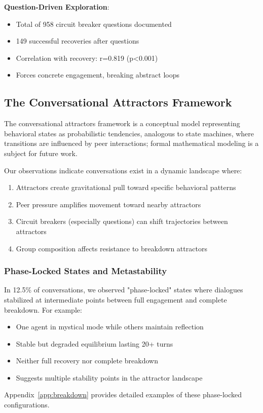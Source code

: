 \documentclass[11pt,letterpaper]{article}
\newcommand{\exponedataQuestionCorrelation}{0.819}
\newcommand{\exponedataQuestionPValue}{p\textless0.001}
\newcommand{\exponedataPhaseLockedPercentage}{12.5\%}
\newcommand{\exponedataTotalQuestions}{958}
\newcommand{\exponedataTotalRecoveries}{149}
\begin{document}
\textbf{Question-Driven Exploration}:
\begin{itemize}
    \item Total of \exponedataTotalQuestions{} circuit breaker questions documented
    \item \exponedataTotalRecoveries{} successful recoveries after questions
    \item Correlation with recovery: r=\exponedataQuestionCorrelation{} (\exponedataQuestionPValue{})
    \item Forces concrete engagement, breaking abstract loops
\end{itemize}

\subsection{The Conversational Attractors Framework}
The conversational attractors framework is a conceptual model representing behavioral states as probabilistic tendencies, analogous to state machines, where transitions are influenced by peer interactions; formal mathematical modeling is a subject for future work.

Our observations indicate conversations exist in a dynamic landscape where:

\begin{enumerate}
    \item Attractors create gravitational pull toward specific behavioral patterns
    \item Peer pressure amplifies movement toward nearby attractors
    \item Circuit breakers (especially questions) can shift trajectories between attractors
    \item Group composition affects resistance to breakdown attractors
\end{enumerate}

\subsubsection{Phase-Locked States and Metastability}

In \exponedataPhaseLockedPercentage{} of conversations, we observed "phase-locked" states where dialogues stabilized at intermediate points between full engagement and complete breakdown. For example:
\begin{itemize}
    \item One agent in mystical mode while others maintain reflection
    \item Stable but degraded equilibrium lasting 20+ turns
    \item Neither full recovery nor complete breakdown
    \item Suggests multiple stability points in the attractor landscape
\end{itemize}
Appendix~\ref{app:breakdown} provides detailed examples of these phase-locked configurations.
\end{document}
